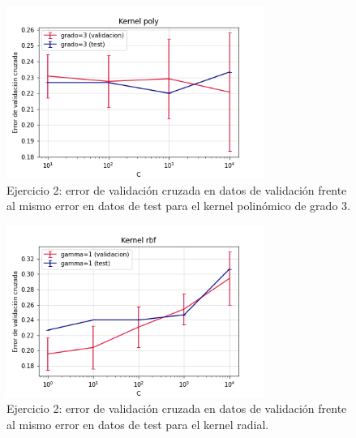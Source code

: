 \documentclass[11pt]{article}
\begin{document}
\begin{figure}[h]
\centering
\includegraphics[width=0.75\textwidth]{fotos/polyTest.png}
\caption{Ejercicio 2: error de validación cruzada en datos de validación frente al mismo error en datos de test para el kernel polinómico de grado 3.}
\end{figure}

\begin{figure}[h]
\centering
\includegraphics[width=0.75\textwidth]{fotos/radialTest.png}
\caption{Ejercicio 2: error de validación cruzada en datos de validación frente al mismo error en datos de test para el kernel radial.}
\end{figure}
\end{document}
